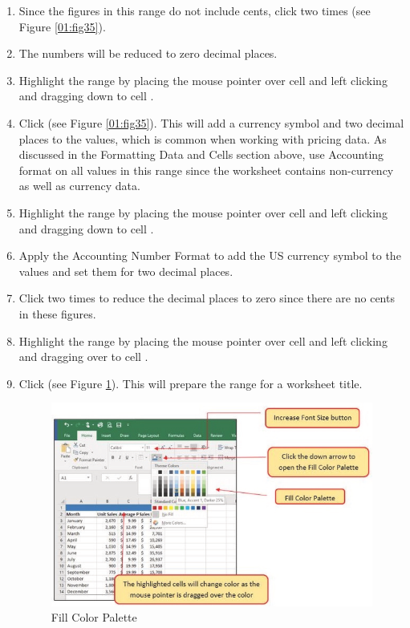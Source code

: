 \begin{enumbox}
	\begin{enumerate}
		\item Since the figures in this range do not include cents, click  two times (see Figure \ref{01:fig35}).
		\item The numbers will be reduced to zero decimal places.
		\item Highlight the range  by placing the mouse pointer over cell  and left clicking and dragging down to cell .
		\item Click  (see Figure \ref{01:fig35}). This will add a currency symbol and two decimal places to the values, which is common when working with pricing data. As discussed in the Formatting Data and Cells section above, use Accounting format on all values in this range since the worksheet contains non-currency as well as currency data.
		\item Highlight the range  by placing the mouse pointer over cell  and left clicking and dragging down to cell .
		\item Apply the Accounting Number Format to add the US currency symbol to the values and set them for two decimal places.
		\item Click  two times to reduce the decimal places to zero since there are no cents in these figures.
		\item Highlight the range  by placing the mouse pointer over cell  and left clicking and dragging over to cell .
		\item Click  (see Figure \ref{01:fig36}). This will prepare the range for a worksheet title.

		\begin{figure}[H]
			\centering
			\includegraphics[width=\maxwidth{.95\linewidth}]{gfx/ch01_fig36}
			\caption{Fill Color Palette}
			\label{01:fig36}
		\end{figure}


\end{enumerate}
\end{enumbox}
